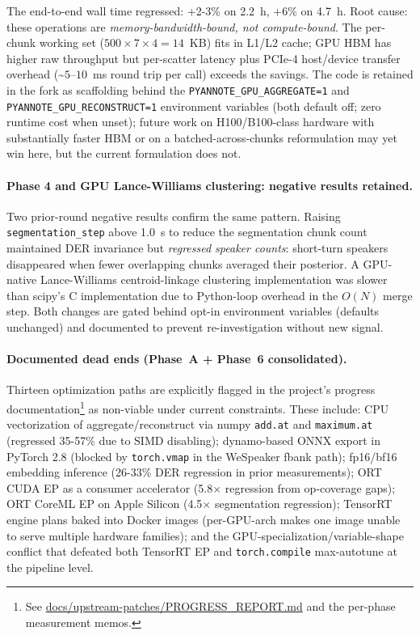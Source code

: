 \documentclass[conference,10pt]{IEEEtran}
\begin{document}
The end-to-end wall time regressed: +2-3\% on 2.2~h, +6\% on 4.7~h. Root
cause: these operations are \emph{memory-bandwidth-bound, not compute-bound}.
The per-chunk working set ($500 \times 7 \times 4 = 14$~KB) fits in L1/L2
cache; GPU HBM has higher raw throughput but per-scatter latency plus
PCIe-4 host/device transfer overhead (\textasciitilde$5$--$10$~ms round trip
per call) exceeds the savings. The code is retained in the fork as
scaffolding behind the \texttt{PYANNOTE\_GPU\_AGGREGATE=1} and
\texttt{PYANNOTE\_GPU\_RECONSTRUCT=1} environment variables (both default
off; zero runtime cost when unset); future work on H100/B100-class hardware
with substantially faster HBM or on a batched-across-chunks reformulation
may yet win here, but the current formulation does not.

\paragraph{Phase 4 and GPU Lance-Williams clustering: negative results retained.}
Two prior-round negative results confirm the same pattern. Raising
\texttt{segmentation\_step} above 1.0~s to reduce the segmentation chunk
count maintained DER invariance but \emph{regressed speaker counts}: short-turn
speakers disappeared when fewer overlapping chunks averaged their posterior.
A GPU-native Lance-Williams centroid-linkage clustering implementation was
slower than scipy's C implementation due to Python-loop overhead in the
$O(N)$ merge step. Both changes are gated behind opt-in environment variables
(defaults unchanged) and documented to prevent re-investigation without new
signal.

\paragraph{Documented dead ends (Phase~A + Phase~6 consolidated).}
Thirteen optimization paths are explicitly flagged in the project's progress
documentation\footnote{See
\url{docs/upstream-patches/PROGRESS\_REPORT.md} and the per-phase
measurement memos.} as non-viable under current constraints. These include:
CPU vectorization of aggregate/reconstruct via numpy \texttt{add.at} and
\texttt{maximum.at} (regressed 35-57\% due to SIMD disabling); dynamo-based
ONNX export in PyTorch 2.8 (blocked by \texttt{torch.vmap} in the WeSpeaker
fbank path); fp16/bf16 embedding inference (26-33\% DER regression in prior
measurements); ORT CUDA EP as a consumer accelerator (5.8$\times$ regression
from op-coverage gaps); ORT CoreML EP on Apple Silicon (4.5$\times$
segmentation regression); TensorRT engine plans baked into Docker images
(per-GPU-arch makes one image unable to serve multiple hardware families);
and the GPU-specialization/variable-shape conflict that defeated both
TensorRT EP and \texttt{torch.compile} max-autotune at the pipeline level.
\end{document}
